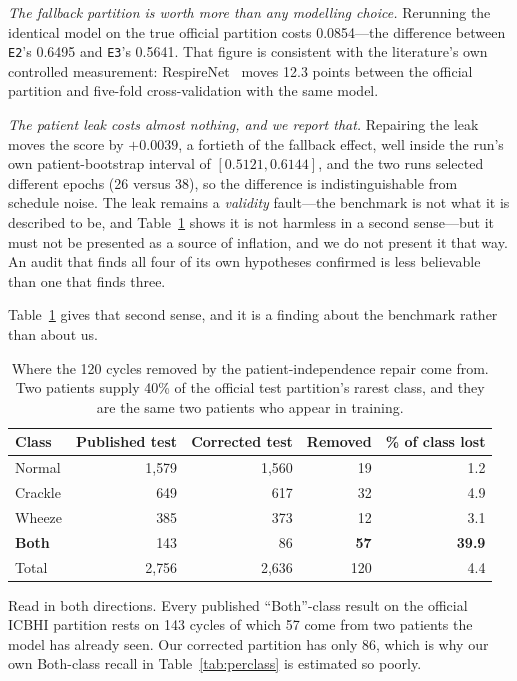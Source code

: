 \documentclass[journal,onecolumn]{IEEEtran}
\newcommand{\best}[1]{\textbf{#1}}
\begin{document}
\emph{The fallback partition is worth more than any modelling choice.} Rerunning
the identical model on the true official partition costs 0.0854---the difference
between \texttt{E2}'s 0.6495 and \texttt{E3}'s 0.5641. That figure is consistent
with the literature's own controlled measurement: RespireNet~\cite{respirenet2021}
moves 12.3 points between the official partition and five-fold cross-validation
with the same model.

\emph{The patient leak costs almost nothing, and we report that.} Repairing the
leak moves the score by $+0.0039$, a fortieth of the fallback effect, well inside
the run's own patient-bootstrap interval of $[0.5121, 0.6144]$, and the two runs
selected different epochs (26 versus 38), so the difference is indistinguishable
from schedule noise. The leak remains a \emph{validity} fault---the benchmark is
not what it is described to be, and Table~\ref{tab:bothclass} shows it is not
harmless in a second sense---but it must not be presented as a source of
inflation, and we do not present it that way. An audit that finds all four of its
own hypotheses confirmed is less believable than one that finds three.

Table~\ref{tab:bothclass} gives that second sense, and it is a finding about the
benchmark rather than about us.

\begin{table}[!t]
\centering
\caption{Where the 120 cycles removed by the patient-independence repair come
from. Two patients supply 40\% of the official test partition's rarest class, and
they are the same two patients who appear in training.}
\label{tab:bothclass}
\small
\begin{tabular}{lrrrr}
\toprule
Class & Published test & Corrected test & Removed & \% of class lost \\
\midrule
Normal  & 1{,}579 & 1{,}560 & 19 & \phantom{0}1.2 \\
Crackle & \phantom{0,}649 & \phantom{0,}617 & 32 & \phantom{0}4.9 \\
Wheeze  & \phantom{0,}385 & \phantom{0,}373 & 12 & \phantom{0}3.1 \\
\best{Both} & \phantom{0,}143 & \phantom{0,0}86 & \best{57} & \best{39.9} \\
\midrule
Total   & 2{,}756 & 2{,}636 & 120 & \phantom{0}4.4 \\
\bottomrule
\end{tabular}

\vspace{2pt}
\footnotesize Read in both directions. Every published ``Both''-class result on
the official ICBHI partition rests on 143 cycles of which 57 come from two
patients the model has already seen. Our corrected partition has only 86, which is
why our own Both-class recall in Table~\ref{tab:perclass} is estimated so poorly.
\end{table}
\end{document}
